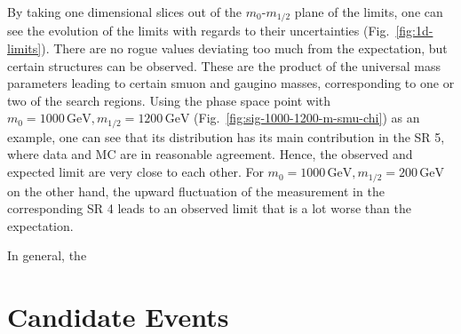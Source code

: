 By taking one dimensional slices out of the $m_0$-$m_{1/2}$ plane of the limits, one can see the evolution of the limits with regards to their uncertainties (Fig.~\ref{fig:1d-limits}). There are no rogue values deviating too much from the expectation, but certain structures can be observed. These are the product of the universal mass parameters leading to certain smuon and gaugino masses, corresponding to one or two of the search regions. Using the phase space point with $m_0 = 1000\,\text{GeV}, m_{1/2} = 1200\,\text{GeV}$ (Fig.~\ref{fig:sig-1000-1200-m-smu-chi}) as an example, one can see that its distribution has its main contribution in the SR 5, where data and MC are in reasonable agreement. Hence, the observed and expected limit are very close to each other. For $m_0 = 1000\,\text{GeV}, m_{1/2} = 200\,\text{GeV}$ on the other hand, the upward fluctuation of the measurement in the corresponding SR 4 leads to an observed limit that is a lot worse than the expectation.

In general, the


\section{Candidate Events}
\label{sec:candidate-events}

